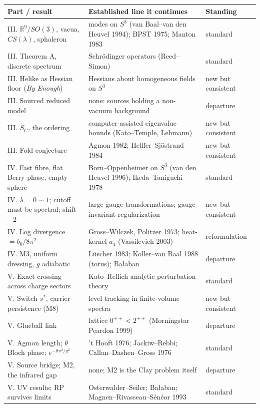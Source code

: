 \begin{center}\small\setlength{\tabcolsep}{4pt}\renewcommand{\arraystretch}{0.97}
\begin{tabular}{@{}p{2.2in}p{3.5in}p{1.1in}@{}}\toprule
\textbf{Part / result} & \textbf{Established line it continues} & \textbf{Standing}\\\midrule
III. $\mathbb R^9/SO(3)$, vacua, $CS(\lambda)$, sphaleron & modes on $S^3$ (van Baal--van den Heuvel 1994); BPST 1975; Manton 1983 & standard\\
III. Theorem A, discrete spectrum & Schr\"odinger operators (Reed--Simon) & standard\\
III. Helike as Hessian floor (\emph{By Enough}) & Hessians about homogeneous fields on $S^3$ & new but consistent\\
III. Sourced reduced model & none: sources holding a non-vacuum background & departure\\
III. $S_C$, the ordering & computer-assisted eigenvalue bounds (Kato--Temple, Lehmann) & new but consistent\\
III. Fold conjecture & Agmon 1982; Helffer--Sj\"ostrand 1984 & new but consistent\\\midrule
IV. Fast fibre, flat Berry phase, empty sphere & Born--Oppenheimer on $S^3$ (van den Heuvel 1996); Ikeda--Taniguchi 1978 & standard\\
IV. $\lambda=0\sim1$; cutoff must be spectral; shift $-2$ & large gauge transformations; gauge-invariant regularization & new but consistent\\
IV. Log divergence $=b_0/8\pi^2$ & Gross--Wilczek, Politzer 1973; heat-kernel $a_4$ (Vassilevich 2003) & reformulation\\
IV. M3, uniform dressing, $g$ adiabatic & L\"uscher 1983; Koller--van Baal 1988 (torus); Ba{\l}aban & departure\\\midrule
V. Exact crossing across charge sectors & Kato--Rellich analytic perturbation theory & standard\\
V. Switch $s^*$, carrier persistence (M8) & level tracking in finite-volume spectra & new but consistent\\
V. Glueball link & lattice $0^{++}<2^{++}$ (Morningstar--Peardon 1999) & departure\\
V. Agmon length; $\theta$ Bloch phase; $e^{-8\pi^2/g^2}$ & 't Hooft 1976; Jackiw--Rebbi; Callan--Dashen--Gross 1976 & standard\\
V. Source bridge; M2, the infrared gap & none; M2 is the Clay problem itself & departure\\
V. UV results; RP survives limits & Osterwalder--Seiler; Ba{\l}aban; Magnen--Rivasseau--S\'en\'eor 1993 & standard\\\bottomrule
\end{tabular}
\end{center}

